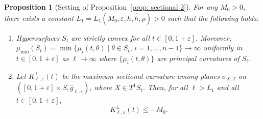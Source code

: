 \documentclass[10pt]{amsart}
\let\sep\mid
\newtheorem{proposition}[theorem]{Proposition}
\theoremstyle{definition}
\let\eps\varepsilon
\renewcommand{\>}{{\rangle}}
\newcommand{\<}{{\langle}}
\begin{document}
\begin{proposition}[Setting of Proposition~\ref{prop: sectional 2}]\label{prop: collar 3}
For any $M_0>0$, there exists a con\-stant $L_1=L_1(M_0, \eps, h, \hat h, \rho)>0$ such that the following holds:
\begin{enumerate}
\item\label{convexity 2} Hypersurfaces $S_t$ are strictly convex for all $t\in[0,1+\eps]$. Moreover, $\mu_{\min}(S_t)=\min\{\mu_{i}(t,\theta)\sep\theta\in S_t,\, i=1,\ldots,n-1\}\to\infty$ uniformly in $t\in[0,1+\eps]$ as $\ell\to\infty$ where $\{\mu_{i}(t,\theta)\}$ are principal curvatures of $S_t$.
\item\label{normal 2} Let $K^\perp_{\ell,\eps}(t)$ be the maximum sectional curvature among planes $\sigma_{X,T}$ on \hbox{$([0,1+\eps]\times S, \hat g_{\ell,\eps})$}, where $X\in T^1S_t$. Then, for all $\ell>L_1$ and all $t\in[0,1+\eps]$,
\begin{equation*}
K^\perp_{\ell,\eps}(t)\leq -M_0.
\end{equation*}

\end{enumerate}
\end{proposition}
\end{document}
